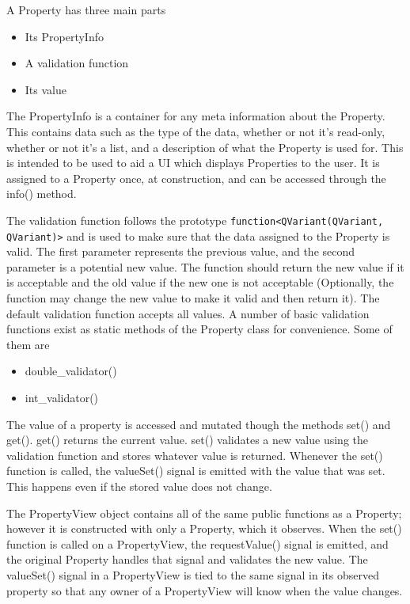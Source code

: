  	A Property has three main parts
 	\begin{itemize}
 		\item Its PropertyInfo
 		\item A validation function
 		\item Its value
 	\end{itemize}
 	
 	The PropertyInfo is a container for any meta information about the Property. This contains data such as the type of the data, whether or not it's read-only, whether or not it's a list, and a description of what the Property is used for. This is intended to be used to aid a UI which displays Properties to the user. It is assigned to a Property once, at construction, and can be accessed through the info() method.
 	
 	The validation function follows the prototype \lstinline|function<QVariant(QVariant, QVariant)>| and is used to make sure that the data assigned to the Property is valid. The first parameter represents the previous value, and the second parameter is a potential new value. The function should return the new value if it is acceptable and the old value if the new one is not acceptable (Optionally, the function may change the new value to make it valid and then return it). The default validation function accepts all values. A number of basic validation functions exist as static methods of the Property class for convenience. Some of them are
 	\begin{itemize}
 		\item double\_validator()
 		\item int\_validator()
 	\end{itemize}
 	
 	The value of a property is accessed and mutated though the methods set() and get(). get() returns the current value. set() validates a new value using the validation function and stores whatever value is returned. Whenever the set() function is called, the valueSet() signal is emitted with the value that was set. This happens even if the stored value does not change.
 	
 	The PropertyView object contains all of the same public functions as a Property; however it is constructed with only a Property, which it observes. When the set() function is called on a PropertyView, the requestValue() signal is emitted, and the original Property handles that signal and validates the new value. The valueSet() signal in a PropertyView is tied to the same signal in its observed property so that any owner of a PropertyView will know when the value changes.
 	
